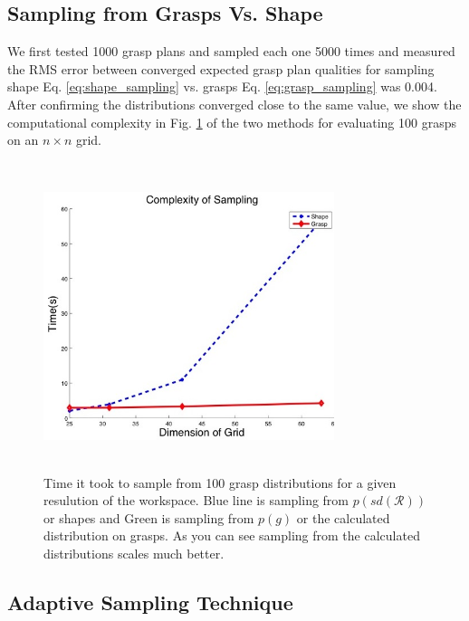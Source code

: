 \documentclass[letterpaper, 10 pt, conference]{ieeeconf}  %
\begin{document}
\subsection{Sampling from Grasps Vs. Shape}
We first tested 1000 grasp plans and sampled each one 5000 times  and measured the RMS error between converged expected grasp plan qualities for sampling shape Eq. \ref{eq:shape_sampling} vs. grasps  Eq. \ref{eq:grasp_sampling} was 0.004. After confirming the distributions converged close to the same value, we show the computational complexity in Fig. \ref{fig:speed_dif} of the two methods for evaluating 100 grasps on an $n \times n$ grid. 


\begin{figure}[ht!]
\centering
\includegraphics[width=8.5cm,height=9cm]{figures/Slide12.jpg}
\caption{Time it took to sample from 100 grasp distributions for a given resulution of the workspace. Blue line is sampling from $p(sd(\mathcal{R}))$ or shapes and Green is sampling from $p(g)$ or the calculated distribution on grasps. As you can see sampling from the calculated distributions scales much better. }
\vspace*{-10pt}
\label{fig:speed_dif}
\end{figure}





\subsection{Adaptive Sampling Technique}
\end{document}
